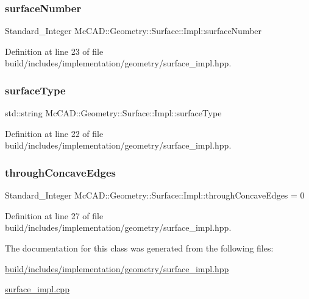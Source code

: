 \subsubsection{\texorpdfstring{surface\+Number}{surfaceNumber}}
{\footnotesize\ttfamily Standard\+\_\+\+Integer Mc\+C\+A\+D\+::\+Geometry\+::\+Surface\+::\+Impl\+::surface\+Number}



Definition at line 23 of file build/includes/implementation/geometry/surface\+\_\+impl.\+hpp.

\mbox{\label{classMcCAD_1_1Geometry_1_1Surface_1_1Impl_a884eb5e53b41a07ccf225b4addb670c3}} 
\subsubsection{\texorpdfstring{surface\+Type}{surfaceType}}
{\footnotesize\ttfamily std\+::string Mc\+C\+A\+D\+::\+Geometry\+::\+Surface\+::\+Impl\+::surface\+Type}



Definition at line 22 of file build/includes/implementation/geometry/surface\+\_\+impl.\+hpp.

\mbox{\label{classMcCAD_1_1Geometry_1_1Surface_1_1Impl_ab1f136a1e90ff9215c1f229070c8b9b7}} 
\subsubsection{\texorpdfstring{through\+Concave\+Edges}{throughConcaveEdges}}
{\footnotesize\ttfamily Standard\+\_\+\+Integer Mc\+C\+A\+D\+::\+Geometry\+::\+Surface\+::\+Impl\+::through\+Concave\+Edges = 0}



Definition at line 27 of file build/includes/implementation/geometry/surface\+\_\+impl.\+hpp.



The documentation for this class was generated from the following files\+:\begin{DoxyCompactItemize}
\item 
\hyperlink{build_2includes_2implementation_2geometry_2surface__impl_8hpp}{build/includes/implementation/geometry/surface\+\_\+impl.\+hpp}\item 
\hyperlink{surface__impl_8cpp}{surface\+\_\+impl.\+cpp}\end{DoxyCompactItemize}
